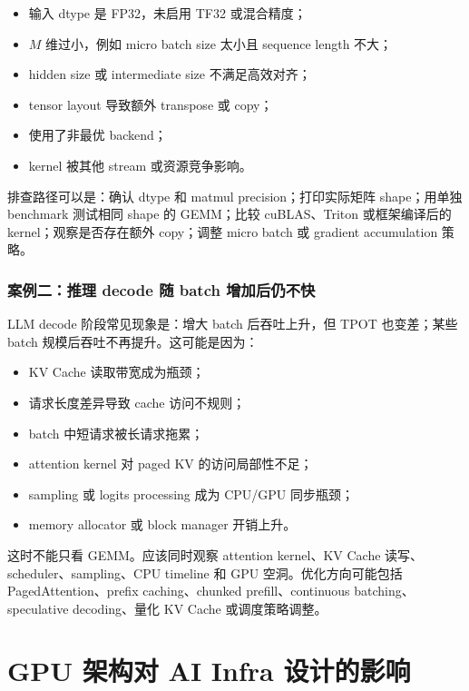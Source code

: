 \begin{itemize}
  \item 输入 dtype 是 FP32，未启用 TF32 或混合精度；
  \item $M$ 维过小，例如 micro batch size 太小且 sequence length 不大；
  \item hidden size 或 intermediate size 不满足高效对齐；
  \item tensor layout 导致额外 transpose 或 copy；
  \item 使用了非最优 backend；
  \item kernel 被其他 stream 或资源竞争影响。
\end{itemize}

排查路径可以是：确认 dtype 和 matmul precision；打印实际矩阵 shape；用单独 benchmark 测试相同 shape 的 GEMM；比较 cuBLAS、Triton 或框架编译后的 kernel；观察是否存在额外 copy；调整 micro batch 或 gradient accumulation 策略。

\subsubsection{案例二：推理 decode 随 batch 增加后仍不快}

LLM decode 阶段常见现象是：增大 batch 后吞吐上升，但 TPOT 也变差；某些 batch 规模后吞吐不再提升。这可能是因为：

\begin{itemize}
  \item KV Cache 读取带宽成为瓶颈；
  \item 请求长度差异导致 cache 访问不规则；
  \item batch 中短请求被长请求拖累；
  \item attention kernel 对 paged KV 的访问局部性不足；
  \item sampling 或 logits processing 成为 CPU/GPU 同步瓶颈；
  \item memory allocator 或 block manager 开销上升。
\end{itemize}

这时不能只看 GEMM。应该同时观察 attention kernel、KV Cache 读写、scheduler、sampling、CPU timeline 和 GPU 空洞。优化方向可能包括 PagedAttention、prefix caching、chunked prefill、continuous batching、speculative decoding、量化 KV Cache 或调度策略调整。

\section{GPU 架构对 AI Infra 设计的影响}
\label{sec:gpu-architecture-ai-infra}

